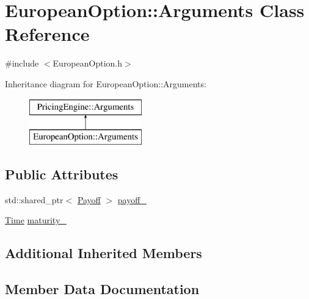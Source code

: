 \hypertarget{class_european_option_1_1_arguments}{}\section{European\+Option\+:\+:Arguments Class Reference}
\label{class_european_option_1_1_arguments}


{\ttfamily \#include $<$European\+Option.\+h$>$}

Inheritance diagram for European\+Option\+:\+:Arguments\+:\begin{figure}[H]
\begin{center}
\leavevmode
\includegraphics[height=2.000000cm]{class_european_option_1_1_arguments}
\end{center}
\end{figure}
\subsection*{Public Attributes}
\begin{DoxyCompactItemize}
\item 
std\+::shared\+\_\+ptr$<$ \hyperlink{class_payoff}{Payoff} $>$ \hyperlink{class_european_option_1_1_arguments_a01a26c6641a2bb9f439c4191c5eb7d76}{payoff\+\_\+}
\item 
\hyperlink{_name_def_8h_ac2d3e0ba793497bcca555c7c2cf64ff3}{Time} \hyperlink{class_european_option_1_1_arguments_a75cb97c8679f5827e3faa8db031e5196}{maturity\+\_\+}
\end{DoxyCompactItemize}
\subsection*{Additional Inherited Members}


\subsection{Member Data Documentation}
\hypertarget{class_european_option_1_1_arguments_a75cb97c8679f5827e3faa8db031e5196}{}\label{class_european_option_1_1_arguments_a75cb97c8679f5827e3faa8db031e5196} 
